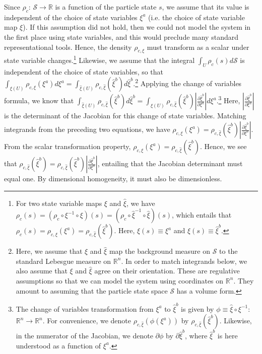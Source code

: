 \documentclass[12pt, twoside]{article}
\begin{document}
Since $\rho_c$: $\mathcal{S} \to \mathbb{R}$ is a function of the particle state $s$, we assume that its value is independent of the choice of state variables $\xi^a$ (i.e. the choice of state variable map $\xi$). If this assumption did not hold, then we could not model the system in the first place using state variables, and this would preclude many standard representational tools. Hence, the density $\rho_{c, \xi}$ must transform as a scalar under state variable changes.\footnote{For two state variable maps $\xi$ and $\hat{\xi}$, we have $\rho_c(s) = (\rho_c \circ \xi^{-1} \circ \xi)(s) = (\rho_c \circ \hat{\xi}^{-1} \circ \hat{\xi})(s)$, which entails that $\rho_c(s) = \rho_{c, \xi} (\xi^a) = \rho_{c, \hat{\xi}} (\hat{\xi}^b)$. Here, $\xi(s) \equiv \xi^a$ and $\hat{\xi}(s) \equiv \hat{\xi}^b$.} Likewise, we assume that the integral $\int_U \rho_c(s) d\mathcal{S} $ is independent of the choice of state variables, so that $\int_{\xi(U)} \rho_{c, \xi} (\xi^a) d \xi^a = \int_{\hat{\xi}(U)} \rho_{c, \hat{\xi}} (\hat{\xi}^b) d \hat{\xi}^b$.\footnote{Here, we assume that $\xi$ and $\hat{\xi}$ map the background measure on $\mathcal{S}$ to the standard Lebesgue measure on $\mathbb{R}^n$. In order to match integrands below, we also assume that $\xi$ and $\hat{\xi}$ agree on their orientation. These are regulative assumptions so that we can model the system using coordinates on $\mathbb{R}^n$. They amount to assuming that the particle state space $\mathcal{S}$ has a volume form.} Applying the change of variables formula, we know that $\int_{\hat{\xi}(U)} \rho_{c, \hat{\xi}} (\hat{\xi}^b) d \hat{\xi}^b= \int_{\xi(U)} \rho_{c, \hat{\xi}} (\hat{\xi}^b) \left|\frac{\partial \hat{\xi}^b}{\partial \xi^a} \right|  d \xi^a$.\footnote{The change of variables transformation from $\xi^a$ to $\hat{\xi}^b$ is given by $\phi \equiv \hat{\xi} \circ \xi^{-1}$: $\mathbb{R}^n \to \mathbb{R}^n $. For convenience, we denote $\rho_{c, \hat{\xi}} (\phi(\xi^a))$ by $\rho_{c, \hat{\xi}} (\hat{\xi}^b)$. Likewise, in the numerator of the Jacobian, we denote $\partial \phi$ by $\partial \hat{\xi}^b$, where $\hat{\xi}^b$ is here understood as a function of $\xi^a$.} Here, $ \left|\frac{\partial \hat{\xi}^b}{\partial \xi^a} \right|$ is the determinant of the Jacobian for this change of state variables. Matching integrands from the preceding two equations, we have $\rho_{c, \xi} (\xi^a) = \rho_{c, \hat{\xi}} (\hat{\xi}^b) \left|\frac{\partial \hat{\xi}^b}{\partial \xi^a} \right|$. From the scalar transformation property, $\rho_{c, \xi} (\xi^a) = \rho_{c, \hat{\xi}} (\hat{\xi}^b)$. Hence, we see that $\rho_{c, \hat{\xi}} (\hat{\xi}^b) =  \rho_{c, \hat{\xi}} (\hat{\xi}^b) \left|\frac{\partial \hat{\xi}^b}{\partial \xi^a} \right|$, entailing that the Jacobian determinant must equal one. By dimensional homogeneity, it must also be dimensionless. 
\end{document}

